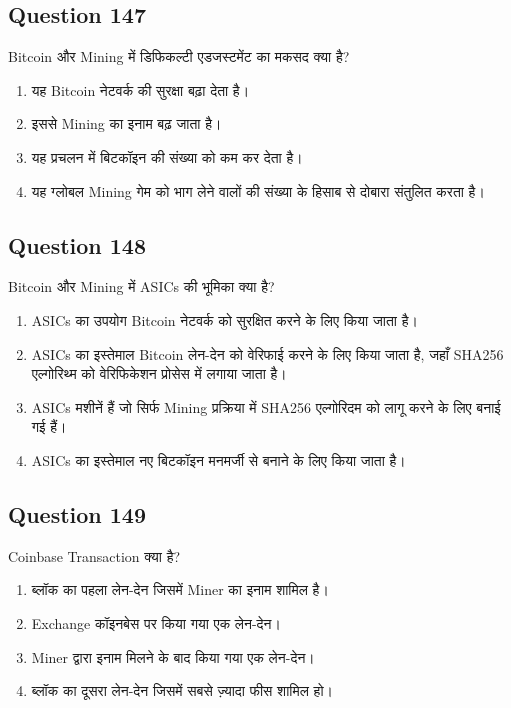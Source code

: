 \documentclass[12pt,a4paper]{article}
\begin{document}
\bigskip


\subsection*{Question 147}
Bitcoin और Mining में डिफिकल्टी एडजस्टमेंट का मकसद क्या है?

\begin{enumerate}[label=\Alph*., leftmargin=*]
\item यह Bitcoin नेटवर्क की सुरक्षा बढ़ा देता है।
\item इससे Mining का इनाम बढ़ जाता है।
\item यह प्रचलन में बिटकॉइन की संख्या को कम कर देता है।
\item यह ग्लोबल Mining गेम को भाग लेने वालों की संख्या के हिसाब से दोबारा संतुलित करता है।
\end{enumerate}

\bigskip


\subsection*{Question 148}
Bitcoin और Mining में ASICs की भूमिका क्या है?

\begin{enumerate}[label=\Alph*., leftmargin=*]
\item ASICs का उपयोग Bitcoin नेटवर्क को सुरक्षित करने के लिए किया जाता है।
\item ASICs का इस्तेमाल Bitcoin लेन-देन को वेरिफाई करने के लिए किया जाता है, जहाँ SHA256 एल्गोरिथ्म को वेरिफिकेशन प्रोसेस में लगाया जाता है।
\item ASICs मशीनें हैं जो सिर्फ Mining प्रक्रिया में SHA256 एल्गोरिदम को लागू करने के लिए बनाई गई हैं।
\item ASICs का इस्तेमाल नए बिटकॉइन मनमर्जी से बनाने के लिए किया जाता है।
\end{enumerate}

\bigskip


\subsection*{Question 149}
Coinbase Transaction क्या है?

\begin{enumerate}[label=\Alph*., leftmargin=*]
\item ब्लॉक का पहला लेन-देन जिसमें Miner का इनाम शामिल है।
\item Exchange कॉइनबेस पर किया गया एक लेन-देन।
\item Miner द्वारा इनाम मिलने के बाद किया गया एक लेन-देन।
\item ब्लॉक का दूसरा लेन-देन जिसमें सबसे ज़्यादा फीस शामिल हो।
\end{enumerate}
\end{document}
